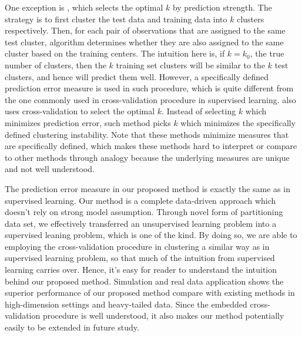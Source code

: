 \documentclass[12pt]{article}
\begin{document}
One exception is \cite{tibshirani2005cluster}, which selects the optimal $k$ by prediction
strength. The strategy is to first cluster the test data and training data
into $k$ clusters respectively. Then, for each pair of observations that are
assigned to the same test cluster, algorithm determines whether they are also
assigned to the same cluster based on the training centers. The intuition here
is, if $k=k_0$, the true number of clusters, then the $k$ training set
clusters will be similar to the $k$ test clusters, and hence will predict them
well. However, a specifically defined prediction error measure is used in such
procedure, which is quite different from the one commonly used in
cross-validation procedure in supervised learning. \citet{wang2010consistent} also uses 
cross-validation to select the optimal $k$. Instead of selecting $k$ which minimizes 
prediction error, such method picks $k$ which minimizes the specifically defined 
clustering instability. Note that these methods minimize measures that are specifically defined,
which makes these methods hard to interpret or compare to other methods through analogy because
the underlying measures are unique and not well understood. 
 
The prediction error measure in our proposed method is exactly the same as in supervised learning.
Our method is a complete data-driven approach which doesn't rely on strong model assumption. Through novel form of partitioning data set, we effectively 
transferred an unsupervised learning problem into a supervised leaning problem, which is one of
the kind. By doing so, we are able to employing the cross-validation procedure in clustering 
a similar way as in supervised learning problem, so that much of the intuition from supervised learning
carries over. Hence, it's easy for reader to
understand the intuition behind our proposed method. Simulation and real data
application shows the superior performance of our proposed method compare with
existing methods in high-dimension settings and heavy-tailed data. Since the
embedded cross-validation procedure is well understood, it also makes our
method potentially easily to be extended in future study. 
\end{document}
